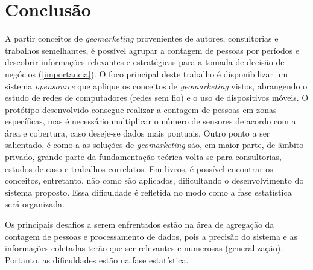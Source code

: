 \chapter{Conclusão}
\label{conclusao}

A partir conceitos de \emph{geomarketing} provenientes
de autores, consultorias e trabalhos semelhantes, é
possível agrupar a contagem de pessoas por períodos e descobrir informações relevantes e estratégicas
para a tomada de decisão de negócios (\autoref{importancia}). O foco principal deste trabalho
é disponibilizar um sistema
\emph{opensource} que aplique os conceitos de \emph{geomarketing} vistos, abrangendo o
estudo de redes de computadores (redes sem fio) e o uso de dispositivos móveis. O protótipo desenvolvido
consegue realizar a contagem de pessoas em zonas específicas,
mas é necessário multiplicar o número de sensores de acordo
com a área e cobertura, caso deseje-se dados mais pontuais. Outro ponto a ser salientado, é como a
as soluções de \emph{geomarketing} são, em maior parte, de âmbito privado, grande parte
da fundamentação teórica volta-se para consultorias, estudos de caso e trabalhos correlatos. Em livros, é
possível encontrar os conceitos, entretanto, não como são aplicados, dificultando o
desenvolvimento do sistema proposto. Essa dificuldade é refletida no modo como a fase
estatística será organizada.

Os principais desafios a serem enfrentados estão na área de agregação da
contagem de pessoas e processamento de dados, pois a precisão do sistema e as
informações coletadas terão que ser relevantes e numerosas (generalização).
Portanto, as dificuldades estão na fase estatística.
